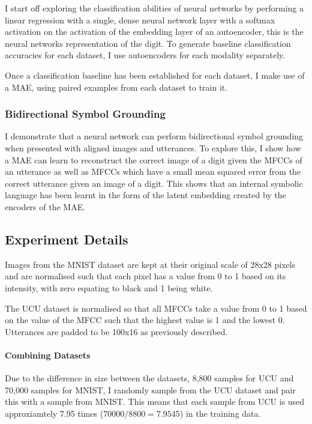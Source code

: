 I start off exploring the classification abilities of neural networks by performing a linear regression with a single, dense neural network layer with a softmax activation on the activation of the embedding layer of an autoencoder, this is the neural networks representation of the digit. To generate baseline classification accuracies for each dataset, I use autoencoders for each modality separately.

Once a classification baseline has been established for each dataset, I make use of a \ac{MAE}, using paired examples from each dataset to train it.

\subsubsection{Bidirectional Symbol Grounding}

I demonstrate that a neural network can perform bidirectional symbol grounding \cite{barsalou2008grounded} when presented with aligned images and utterances. To explore this, I show how a \ac{MAE} can learn to reconstruct the correct image of a digit given the \acp{MFCC} of an utterance as well as \acp{MFCC} which have a small mean squared error from the correct utterance given an image of a digit. This shows that an internal symbolic language has been learnt in the form of the latent embedding created by the encoders of the \ac{MAE}.


\subsection{Experiment Details}
Images from the MNIST dataset are kept at their original scale of 28x28 pixels and are normalised such that each pixel has a value from 0 to 1 based on its intensity, with zero equating to black and 1 being white.

The UCU dataset is normalised so that all \acp{MFCC} take a value from 0 to 1 based on the value of the \ac{MFCC} such that the highest value is 1 and the lowest 0. Utterances are padded to be 100x16 as previously described.

\paragraph{Combining Datasets}
\label{sec:UCU_mnist_comb}
Due to the difference in size between the datasets, 8,800 samples for UCU and 70,000 samples for MNIST, I randomly sample from the UCU dataset and pair this with a sample from MNIST. This means that each sample from UCU is used approxiamtely 7.95 times ($70000/8800=7.9545$) in the training data.

